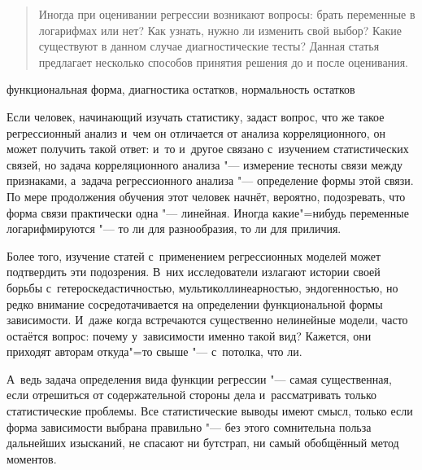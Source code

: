 \documentclass[11pt]{article}
\begin{document}
\setcounter{page}{15}

		
		
\DoFirstPageTechnicalStuff
		
\begin{abstract}
		Иногда при оценивании регрессии возникают вопросы: брать переменные в логарифмах или нет? Как узнать, нужно ли изменить свой выбор? Какие существуют в данном случае диагностические тесты? Данная статья предлагает несколько способов принятия решения до и после оценивания.
\end{abstract}
		
\begin{keyword}
функциональная форма, диагностика остатков, нормальность остатков
\end{keyword}


Если человек, начинающий изучать статистику, задаст вопрос, что же такое регрессионный анализ и~чем он отличается от анализа корреляционного, он может получить такой ответ: и~то и~другое связано с~изучением статистических связей, но задача корреляционного анализа "--- измерение тесноты связи между признаками, а~задача регрессионного анализа "--- определение формы этой связи. По мере продолжения обучения этот человек начнёт, вероятно, подозревать, что форма связи практически одна "--- линейная. Иногда какие"=нибудь переменные логарифмируются "--- то ли для разнообразия, то ли для приличия.

Более того, изучение статей с~применением регрессионных моделей может подтвердить эти подозрения. В~них исследователи излагают истории своей борьбы с~гетероскедастичностью, мультиколлинеарностью, эндогенностью, но редко внимание сосредотачивается на определении функциональной формы зависимости. И~даже когда встречаются существенно нелинейные модели, часто остаётся вопрос: почему у~зависимости именно такой вид? Кажется, они приходят авторам откуда"=то свыше "--- с~потолка, что ли.

А~ведь задача определения вида функции регрессии "--- самая существенная, если отрешиться от содержательной стороны дела и~рассматривать только статистические проблемы. Все статистические выводы имеют смысл, только если форма зависимости выбрана правильно "--- без этого сомнительна польза дальнейших изысканий, не спасают ни бутстрап, ни самый обобщённый метод моментов.
\end{document}
